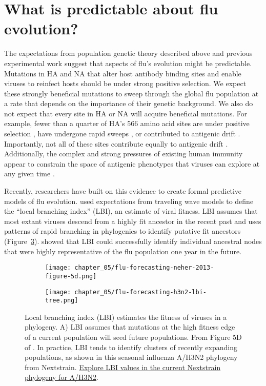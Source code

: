 \section{What is predictable about flu evolution?}

The expectations from population genetic theory described above and previous experimental work suggest that aspects of flu's evolution might be predictable.
Mutations in HA and NA that alter host antibody binding sites and enable viruses to reinfect hosts should be under strong positive selection.
We expect these strongly beneficial mutations to sweep through the global flu population at a rate that depends on the importance of their genetic background.
We also do not expect that every site in HA or NA will acquire beneficial mutations.
For example, fewer than a quarter of HA's 566 amino acid sites are under positive selection \citep{Bush:1999vj}, have undergone rapid sweeps \citep{Shih:2007bd}, or contributed to antigenic drift \citep{Wolf:2006da}.
Importantly, not all of these sites contribute equally to antigenic drift \citep{Koel:2013jz}.
Additionally, the complex and strong pressures of existing human immunity appear to constrain the space of antigenic phenotypes that viruses can explore at any given time \citep{Smith:2004jc,Bedford2012}.

Recently, researchers have built on this evidence to create formal predictive models of flu evolution.
\citet{Neher:2014eu} used expectations from traveling wave models to define the ``local branching index'' (LBI), an estimate of viral fitness.
LBI assumes that most extant viruses descend from a highly fit ancestor in the recent past and uses patterns of rapid branching in phylogenies to identify putative fit ancestors (Figure~\ref{fig:lbi}).
\citet{Neher:2014eu} showed that LBI could successfully identify individual ancestral nodes that were highly representative of the flu population one year in the future.

\begin{figure}
  \centering
  \begin{subfigure}[b]{0.5\columnwidth}
    \centering
    \texttt{[image: chapter\_05/flu-forecasting-neher-2013-figure-5d.png]}
    \label{fig:lbi-theory}
  \end{subfigure}

  \begin{subfigure}[b]{0.65\columnwidth}
    \centering
    \texttt{[image: chapter\_05/flu-forecasting-h3n2-lbi-tree.png]}
    \label{fig:lbi-practice}
  \end{subfigure}

  \caption{Local branching index (LBI) estimates the fitness of viruses in a phylogeny.
    A) LBI assumes that mutations at the high fitness edge of a current population will seed future populations.
    From Figure 5D of \citet{Neher2013}.
    In practice, LBI tends to identify clusters of recently expanding populations, as shown in this seasonal influenza A/H3N2 phylogeny from Nextstrain.
    \href{https://nextstrain.org/flu/seasonal/h3n2/ha/2y?c=lbi}{Explore LBI values in the current Nextstrain phylogeny for A/H3N2}.
  }
  \label{fig:lbi}
\end{figure}

